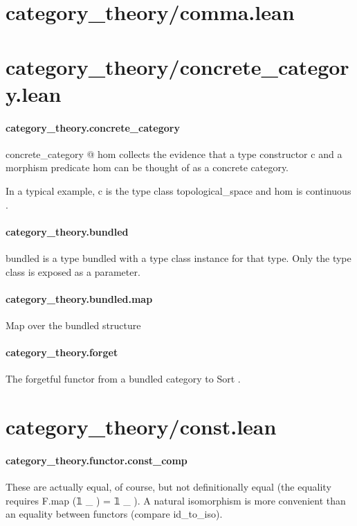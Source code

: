 \documentclass{article}
\begin{document}
\section{category\_theory/comma.lean}\section{category\_theory/concrete\_category.lean}\paragraph{category\_theory.concrete\_category}
\par
\colorbox[RGB]{253,246,227}{{{{\color[RGB]{101, 123, 131} concrete\_category  }}}{{{\color[RGB]{181, 137, 0} @ }}}{{{\color[RGB]{101, 123, 131} hom }}}} collects the evidence that a type constructor 
\colorbox[RGB]{253,246,227}{{{{\color[RGB]{101, 123, 131} c }}}} and a
morphism predicate 
\colorbox[RGB]{253,246,227}{{{{\color[RGB]{101, 123, 131} hom }}}} can be thought of as a concrete category.
\par
In a typical example, 
\colorbox[RGB]{253,246,227}{{{{\color[RGB]{101, 123, 131} c }}}} is the type class 
\colorbox[RGB]{253,246,227}{{{{\color[RGB]{101, 123, 131} topological\_space }}}} and 
\colorbox[RGB]{253,246,227}{{{{\color[RGB]{101, 123, 131} hom }}}} is
\colorbox[RGB]{253,246,227}{{{{\color[RGB]{101, 123, 131} continuous }}}}.
\paragraph{category\_theory.bundled}
\par
\colorbox[RGB]{253,246,227}{{{{\color[RGB]{101, 123, 131} bundled }}}} is a type bundled with a type class instance for that type. Only
the type class is exposed as a parameter.
\paragraph{category\_theory.bundled.map}
\par
Map over the bundled structure
\paragraph{category\_theory.forget}
\par
The forgetful functor from a bundled category to 
\colorbox[RGB]{253,246,227}{{{{\color[RGB]{101, 123, 131} Sort }}}}.
\section{category\_theory/const.lean}\paragraph{category\_theory.functor.const\_comp}
\par
These are actually equal, of course, but not definitionally equal
(the equality requires F.map (𝟙 
\_
) = 𝟙 
\_
). A natural isomorphism is
more convenient than an equality between functors (compare id\_to\_iso).
\end{document}
